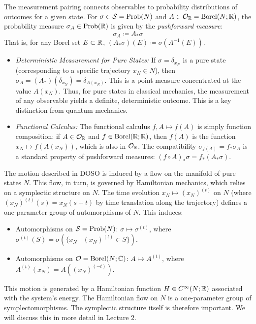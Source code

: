 The measurement pairing connects observables to probability distributions of outcomes for a given state. For $\sigma \in \mathcal{S} = \text{Prob}(N)$ and $A \in \mathcal{O}_{\mathbb{R}} = \text{Borel}(N;\mathbb{R})$, the probability measure $\sigma_A \in \text{Prob}(\mathbb{R})$ is given by the \emph{pushforward measure}:
\[ \sigma_A \coloneqq A_*\sigma\]
That is, for any Borel set $E \subset \mathbb{R}$, $(A_*\sigma)(E) \coloneqq \sigma(A^{-1}(E))$.
\begin{itemize}
\item \textit{Deterministic Measurement for Pure States:} If $\sigma = \delta_{x_N}$ is a pure state (corresponding to a specific trajectory $x_N \in N$), then $\sigma_A = (A_*)(\delta_{x_N}) = \delta_{A(x_N)}$. This is a point measure concentrated at the value $A(x_N)$. Thus, for pure states in classical mechanics, the measurement of any observable yields a definite, deterministic outcome. This is a key distinction from quantum mechanics.
\item \textit{Functional Calculus:} The functional calculus $f, A \mapsto f(A)$ is simply function composition: if $A \in \mathcal{O}_{\mathbb{R}}$ and $f \in \text{Borel}(\mathbb{R};\mathbb{R})$, then $f(A)$ is the function $x_N \mapsto f(A(x_N))$, which is also in $\mathcal{O}_{\mathbb{R}}$. The compatibility $\sigma_{f(A)} = f_* \sigma_A$ is a standard property of pushforward measures: $(f \circ A)_* \sigma = f_* (A_* \sigma)$.
\end{itemize}

The motion described in DOSO is induced by a flow on the manifold of pure states $N$. This flow, in turn, is governed by Hamiltonian mechanics, which relies on a symplectic structure on $N$.
The time evolution $x_N \mapsto (x_N)^{(t)}$ on $N$ (where $(x_N)^{(t)}(s) = x_N(s+t)$ by time translation along the trajectory) defines a one-parameter group of automorphisms of $N$.
This induces:
\begin{itemize}
\item Automorphisms on $\mathcal{S} = \text{Prob}(N)$: $\sigma \mapsto \sigma^{(t)}$, where $\sigma^{(t)}(S) = \sigma(\{x_N \mid (x_N)^{(t)} \in S\})$.
\item Automorphisms on $\mathcal{O} = \text{Borel}(N;\mathbb{C})$: $A \mapsto A^{(t)}$, where $A^{(t)}(x_N) = A((x_N)^{(-t)})$.
\end{itemize}
This motion is generated by a Hamiltonian function $H \in C^\infty(N;\mathbb{R})$ associated with the system's energy. The Hamiltonian flow on $N$ is a one-parameter group of symplectomorphisms. The symplectic structure itself is therefore important. We will discuss this in more detail in Lecture 2.

